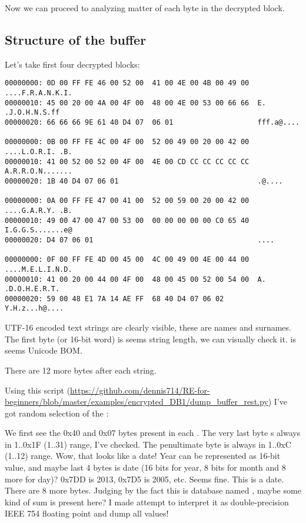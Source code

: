 Now we can proceed to analyzing matter of each byte in the decrypted block.

\subsection{Structure of the buffer}

Let's take first four decrypted blocks:

\begin{lstlisting}
00000000: 0D 00 FF FE 46 00 52 00  41 00 4E 00 4B 00 49 00  ....F.R.A.N.K.I.
00000010: 45 00 20 00 4A 00 4F 00  48 00 4E 00 53 00 66 66  E. .J.O.H.N.S.ff
00000020: 66 66 66 9E 61 40 D4 07  06 01                    fff.a@....

00000000: 0B 00 FF FE 4C 00 4F 00  52 00 49 00 20 00 42 00  ....L.O.R.I. .B.
00000010: 41 00 52 00 52 00 4F 00  4E 00 CD CC CC CC CC CC  A.R.R.O.N.......
00000020: 1B 40 D4 07 06 01                                 .@....

00000000: 0A 00 FF FE 47 00 41 00  52 00 59 00 20 00 42 00  ....G.A.R.Y. .B.
00000010: 49 00 47 00 47 00 53 00  00 00 00 00 00 C0 65 40  I.G.G.S.......e@
00000020: D4 07 06 01                                       ....

00000000: 0F 00 FF FE 4D 00 45 00  4C 00 49 00 4E 00 44 00  ....M.E.L.I.N.D.
00000010: 41 00 20 00 44 00 4F 00  48 00 45 00 52 00 54 00  A. .D.O.H.E.R.T.
00000020: 59 00 48 E1 7A 14 AE FF  68 40 D4 07 06 02        Y.H.z...h@....
\end{lstlisting}

UTF-16 encoded text strings are clearly visible, these are names and surnames.
The first byte (or 16-bit word) is seems string length, we can visually check it.
 is seems Unicode \ac{BOM}.

There are 12 more bytes after each string.

Using this script
(\url{https://github.com/dennis714/RE-for-beginners/blob/master/examples/encrypted_DB1/dump_buffer_rest.py})
I've got random selection of the :



We first see the 0x40 and 0x07 bytes present in each .
The very last byte s always in 1..0x1F (1..31) range, I've checked.
The penultimate byte is always in 1..0xC (1..12) range.
Wow, that looks like a date!
Year can be represented as 16-bit value, and maybe last 4 bytes is date (16 bits for year, 8 bits
for month and 8 more for day)?
0x7DD is 2013, 0x7D5 is 2005, etc. Seems fine. This is a date.
There are 8 more bytes.
Judging by the fact this is database named , maybe some kind of sum is present here?
I made attempt to interpret it as double-precision IEEE 754 floating point and dump all values!


